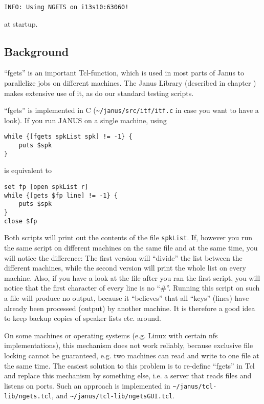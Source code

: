 \begin{verbatim}
INFO: Using NGETS on i13s10:63060!
\end{verbatim}

at startup.


\subsection*{Background} \label{trouble:fgetsbackground}

``fgets'' is an important Tcl-function, which is used in most parts of
Janus  to parallelize  jobs  on different machines.  The Janus Library
(described  in chapter )  makes extensive use of it, as
do our standard testing scripts.

``fgets'' is implemented  in C (\texttt{\~{ }/janus/src/itf/itf.c}  in
case you want to have a look).  If you run  JANUS on a single machine,
using

\begin{verbatim}
while {[fgets spkList spk] != -1} {
    puts $spk
}
\end{verbatim}

is equivalent to 

\begin{verbatim}
set fp [open spkList r]
while {[gets $fp line] != -1} {
    puts $spk
}
close $fp
\end{verbatim}

Both   scripts will  print    out    the   contents  of  the      file
\texttt{spkList}.   If, however you run   the same script on different
machines on  the same file  and at the same  time, you will notice the
difference:  The first version   will ``divide'' the list between  the
different machines, while the second version will print the whole list
on every machine. Also, if you  have a look at the  file after you ran
the first  script, you will notice that  the  first character of every
line is no ``\#''.  Running this script on such a file will produce no
output, because it ``believes'' that all ``keys'' (lines) have already
been  processed  (output) by another machine.  It  is therefore a good
idea to keep backup copies of speaker lists etc. around.

On some  machines or operating  systems  (e.g. Linux  with certain nfs
implementations),  this  mechanism  does not    work reliably, because
exclusive file  locking  cannot be guaranteed,  e.g.  two machines can
read and write to one file at the same time.   The easiest solution to
this problem   is to re-define  ``fgets''  in   Tcl  and replace  this
mechanism  by  something  else,  i.e. a server   that reads  files and
listens   on ports.  Such an  approach   is implemented in 
\texttt{\~{ }/janus/tcl-lib/ngets.tcl},                and             
\texttt{\~{ }/janus/tcl-lib/ngetsGUI.tcl}.


